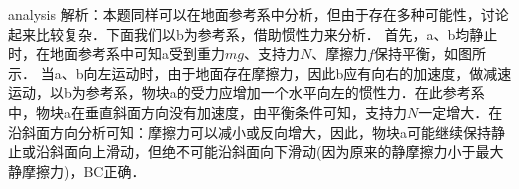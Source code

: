 \begin{example}
	
	\begin{taggedblock}{analysis}
		解析：本题同样可以在地面参考系中分析，但由于存在多种可能性，讨论起来比较复杂．下面我们以b为参考系，借助惯性力来分析．
		首先，a、b均静止时，在地面参考系中可知a受到重力$ mg $、支持力$ N $、摩擦力$ f $保持平衡，如图所示．
		当a、b向左运动时，由于地面存在摩擦力，因此b应有向右的加速度，做减速运动，以b为参考系，物块a的受力应增加一个水平向左的惯性力．在此参考系中，物块a在垂直斜面方向没有加速度，由平衡条件可知，支持力$ N $一定增大．在沿斜面方向分析可知：摩擦力可以减小或反向增大，因此，物块a可能继续保持静止或沿斜面向上滑动，但绝不可能沿斜面向下滑动(因为原来的静摩擦力小于最大静摩擦力)，BC正确．
		
	\end{taggedblock}
\end{example}


